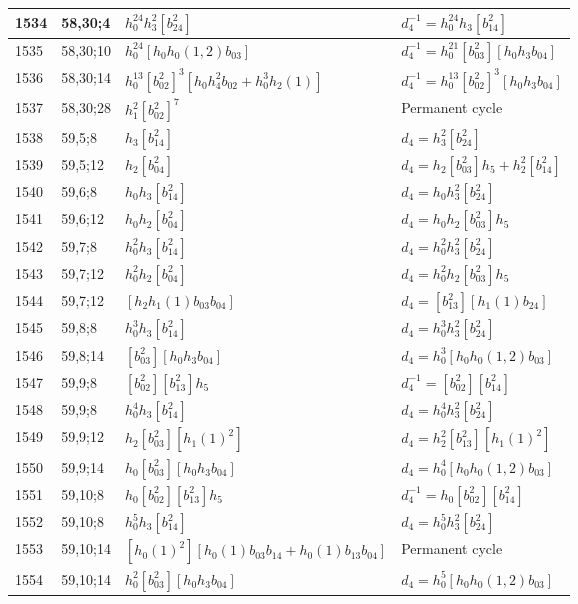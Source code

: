 \documentclass{article}
\begin{document}
\begin{longtable}{|l|l|>{\raggedright\arraybackslash}p{6cm}|>{\raggedright\arraybackslash}p{6cm}|}
1534 & 58,30;4 & $h_0^{24}h_3^2[b_{24}^2]$ & $d_{4}^{-1}=h_0^{24}h_3[b_{14}^2]$\\
\hline
1535 & 58,30;10 & $h_0^{24}[h_0h_0(1, 2)b_{03}]$ & $d_{4}^{-1}=h_0^{21}[b_{03}^2][h_0h_3b_{04}]$\\
\hline
1536 & 58,30;14 & $h_0^{13}[b_{02}^2]^3[h_0h_4^2b_{02} + h_0^3h_2(1)]$ & $d_{4}^{-1}=h_0^{13}[b_{02}^2]^3[h_0h_3b_{04}]$\\
\hline
1537 & 58,30;28 & $h_1^2[b_{02}^2]^7$ & Permanent cycle\\
\hline
1538 & 59,5;8 & $h_3[b_{14}^2]$ &$d_{4}=h_3^2[b_{24}^2]$\\
\hline
1539 & 59,5;12 & $h_2[b_{04}^2]$ &$d_{4}=h_2[b_{03}^2]h_5 + h_2^2[b_{14}^2]$\\
\hline
1540 & 59,6;8 & $h_0h_3[b_{14}^2]$ &$d_{4}=h_0h_3^2[b_{24}^2]$\\
\hline
1541 & 59,6;12 & $h_0h_2[b_{04}^2]$ &$d_{4}=h_0h_2[b_{03}^2]h_5$\\
\hline
1542 & 59,7;8 & $h_0^2h_3[b_{14}^2]$ &$d_{4}=h_0^2h_3^2[b_{24}^2]$\\
\hline
1543 & 59,7;12 & $h_0^2h_2[b_{04}^2]$ &$d_{4}=h_0^2h_2[b_{03}^2]h_5$\\
1544 & 59,7;12 & $[h_2h_1(1)b_{03}b_{04}]$ &$d_{4}=[b_{13}^2][h_1(1)b_{24}]$\\
\hline
1545 & 59,8;8 & $h_0^3h_3[b_{14}^2]$ &$d_{4}=h_0^3h_3^2[b_{24}^2]$\\
\hline
1546 & 59,8;14 & $[b_{03}^2][h_0h_3b_{04}]$ &$d_{4}=h_0^3[h_0h_0(1, 2)b_{03}]$\\
\hline
1547 & 59,9;8 & $[b_{02}^2][b_{13}^2]h_5$ & $d_{4}^{-1}=[b_{02}^2][b_{14}^2]$\\
1548 & 59,9;8 & $h_0^4h_3[b_{14}^2]$ &$d_{4}=h_0^4h_3^2[b_{24}^2]$\\
\hline
1549 & 59,9;12 & $h_2[b_{03}^2][h_1(1)^2]$ &$d_{4}=h_2^2[b_{13}^2][h_1(1)^2]$\\
\hline
1550 & 59,9;14 & $h_0[b_{03}^2][h_0h_3b_{04}]$ &$d_{4}=h_0^4[h_0h_0(1, 2)b_{03}]$\\
\hline
1551 & 59,10;8 & $h_0[b_{02}^2][b_{13}^2]h_5$ & $d_{4}^{-1}=h_0[b_{02}^2][b_{14}^2]$\\
1552 & 59,10;8 & $h_0^5h_3[b_{14}^2]$ &$d_{4}=h_0^5h_3^2[b_{24}^2]$\\
\hline
1553 & 59,10;14 & $[h_0(1)^2][h_0(1)b_{03}b_{14} + h_0(1)b_{13}b_{04}]$ & Permanent cycle\\
1554 & 59,10;14 & $h_0^2[b_{03}^2][h_0h_3b_{04}]$ &$d_{4}=h_0^5[h_0h_0(1, 2)b_{03}]$\\

\end{longtable}
\end{document}
